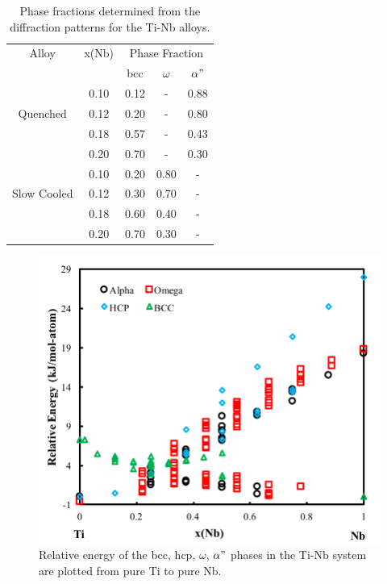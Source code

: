 \newpage
\begin{table}[H]
	\caption{Phase fractions determined from the diffraction patterns for the Ti-Nb alloys.}
	\centering
	\begin{tabular}{ c c c c c }
		\hline
		Alloy & x(Nb) & \multicolumn{3}{c}{Phase Fraction} \\
		&  & bcc & $\omega$ & $\alpha"$ \\
		\hline
		& 0.10 & 0.12 & - & 0.88 \\
		Quenched & 0.12 & 0.20 & - & 0.80 \\
		& 0.18 & 0.57 & - & 0.43 \\
		& 0.20 & 0.70 & - & 0.30 \\
		\hline
		& 0.10 & 0.20 & 0.80 & - \\
		Slow Cooled & 0.12 & 0.30 & 0.70 & - \\
		& 0.18 & 0.60 & 0.40 & - \\
		& 0.20 & 0.70 & 0.30 & - \\
		\hline
	\end{tabular}
	\label{Ch7-table:phasefrac}
\end{table}
\clearpage

\pagebreak
\begin{figure}[H]
	\centering
	\includegraphics[width=\textwidth]{Chapter-7/Figures/tinb0k.png}
	\caption{Relative energy of the bcc, hcp, $\omega$, $\alpha"$ phases in the Ti-Nb system are plotted from pure Ti to pure Nb.}
	\label{Ch7-figure:tinb0K}
\end{figure}

